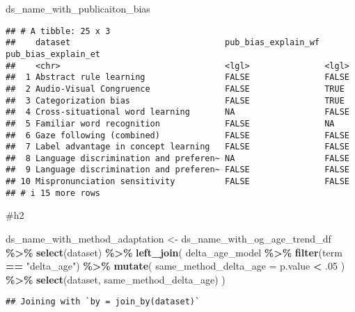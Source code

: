\documentclass[
]{article}
\newenvironment{Shaded}{\begin{snugshade}}{\end{snugshade}}
\newcommand{\AttributeTok}[1]{\textcolor[rgb]{0.13,0.29,0.53}{#1}}
\newcommand{\DecValTok}[1]{\textcolor[rgb]{0.00,0.00,0.81}{#1}}
\newcommand{\FunctionTok}[1]{\textcolor[rgb]{0.13,0.29,0.53}{\textbf{#1}}}
\newcommand{\NormalTok}[1]{#1}
\newcommand{\OtherTok}[1]{\textcolor[rgb]{0.56,0.35,0.01}{#1}}
\newcommand{\SpecialCharTok}[1]{\textcolor[rgb]{0.81,0.36,0.00}{\textbf{#1}}}
\newcommand{\StringTok}[1]{\textcolor[rgb]{0.31,0.60,0.02}{#1}}
\begin{document}
\begin{Shaded}
\begin{Highlighting}[]
\NormalTok{ds\_name\_with\_publicaiton\_bias}
\end{Highlighting}
\end{Shaded}

\begin{verbatim}
## # A tibble: 25 x 3
##    dataset                               pub_bias_explain_wf pub_bias_explain_et
##    <chr>                                 <lgl>               <lgl>              
##  1 Abstract rule learning                FALSE               FALSE              
##  2 Audio-Visual Congruence               FALSE               TRUE               
##  3 Categorization bias                   FALSE               TRUE               
##  4 Cross-situational word learning       NA                  FALSE              
##  5 Familiar word recognition             FALSE               NA                 
##  6 Gaze following (combined)             FALSE               FALSE              
##  7 Label advantage in concept learning   FALSE               FALSE              
##  8 Language discrimination and preferen~ NA                  FALSE              
##  9 Language discrimination and preferen~ FALSE               FALSE              
## 10 Mispronunciation sensitivity          FALSE               FALSE              
## # i 15 more rows
\end{verbatim}

\#h2

\begin{Shaded}
\begin{Highlighting}[]
\NormalTok{ds\_name\_with\_method\_adaptation }\OtherTok{\textless{}{-}}\NormalTok{ ds\_name\_with\_og\_age\_trend\_df }\SpecialCharTok{\%\textgreater{}\%} 
  \FunctionTok{select}\NormalTok{(dataset) }\SpecialCharTok{\%\textgreater{}\%} 
  \FunctionTok{left\_join}\NormalTok{(}
\NormalTok{    delta\_age\_model }\SpecialCharTok{\%\textgreater{}\%} 
  \FunctionTok{filter}\NormalTok{(term }\SpecialCharTok{==} \StringTok{"delta\_age"}\NormalTok{) }\SpecialCharTok{\%\textgreater{}\%} 
  \FunctionTok{mutate}\NormalTok{(}
    \AttributeTok{same\_method\_delta\_age =}\NormalTok{ p.value }\SpecialCharTok{\textless{}}\NormalTok{ .}\DecValTok{05}
\NormalTok{  ) }\SpecialCharTok{\%\textgreater{}\%} 
  \FunctionTok{select}\NormalTok{(dataset, same\_method\_delta\_age)}
\NormalTok{  )}
\end{Highlighting}
\end{Shaded}

\begin{verbatim}
## Joining with `by = join_by(dataset)`
\end{verbatim}
\end{document}
